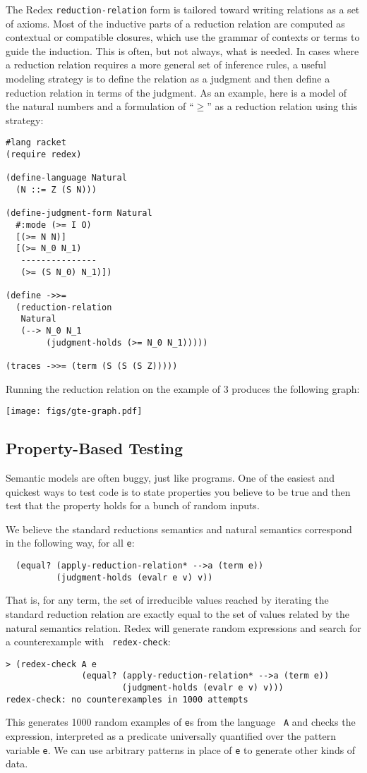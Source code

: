 The Redex {\tt reduction-relation} form is tailored toward writing
relations as a set of axioms.  Most of the inductive parts of a
reduction relation are computed as contextual or compatible closures,
which use the grammar of contexts or terms to guide the induction.
This is often, but not always, what is needed.  In cases where a
reduction relation requires a more general set of inference rules, a
useful modeling strategy is to define the relation as a judgment and
then define a reduction relation in terms of the judgment.  As an
example, here is a model of the natural numbers and a formulation of
``$\geq$'' as a reduction relation using this strategy:
\begin{verbatim}
#lang racket
(require redex)

(define-language Natural
  (N ::= Z (S N)))

(define-judgment-form Natural
  #:mode (>= I O)
  [(>= N N)]
  [(>= N_0 N_1)
   ---------------
   (>= (S N_0) N_1)])

(define ->>=
  (reduction-relation
   Natural
   (--> N_0 N_1
        (judgment-holds (>= N_0 N_1)))))

(traces ->>= (term (S (S (S Z)))))
\end{verbatim}

Running the reduction relation on the example of 3 produces the
following graph:
\begin{center}
\texttt{[image: figs/gte-graph.pdf]}
\end{center}


\subsection{Property-Based Testing}

Semantic models are often buggy, just like programs.  One of the
easiest and quickest ways to test code is to state properties you
believe to be true and then test that the property holds for a bunch
of random inputs.

We believe the standard reductions semantics and natural semantics
correspond in the following way, for all {\tt e}:
\begin{verbatim}
  (equal? (apply-reduction-relation* -->a (term e))
          (judgment-holds (evalr e v) v))
\end{verbatim}
That is, for any term, the set of irreducible values reached by
iterating the standard reduction relation are exactly equal to the set
of values related by the natural semantics relation.  Redex will
generate random expressions and search for a counterexample with {\tt
  redex-check}:
\begin{verbatim}
> (redex-check A e
               (equal? (apply-reduction-relation* -->a (term e))
                       (judgment-holds (evalr e v) v)))
redex-check: no counterexamples in 1000 attempts
\end{verbatim}
This generates 1000 random examples of {\tt e}s from the language {\tt
  A} and checks the expression, interpreted as a predicate universally
quantified over the pattern variable {\tt e}.  We can use arbitrary
patterns in place of {\tt e} to generate other kinds of data.

